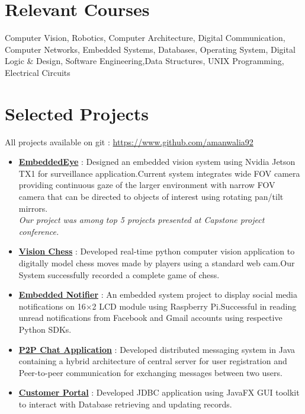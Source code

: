\documentclass[margin, centered]{res}
\begin{document}
\begin{resume}
\section{Relevant \hspace{2mm} Courses}
 
Computer Vision, Robotics, Computer Architecture, Digital Communication, Computer Networks, Embedded Systems, Databases, Operating System, Digital Logic \& Design, Software Engineering,Data Structures, UNIX Programming, Electrical Circuits 

\section{Selected Projects}
All projects available on git : \url{https://www.github.com/amanwalia92}\\
\begin{itemize}[leftmargin=*]
    \item \textbf{\href{https://github.com/amanwalia92/EmbeddedEye}{EmbeddedEye}} : Designed an embedded vision system using Nvidia Jetson TX1 for surveillance application.Current system integrates wide FOV camera providing continuous gaze of the larger environment with narrow FOV camera that can be directed to objects of interest using rotating pan/tilt mirrors. \\
    \textit{Our project was among top 5 projects presented at Capstone project conference.} 
	\item \textbf{\href{https://github.com/amanwalia92/VisionChess}{Vision Chess}} : Developed real-time python computer vision application to digitally model chess moves made by players using a standard web cam.Our System successfully recorded a complete game of chess.
	\item \textbf{\href{https://github.com/amanwalia92/EmbeddedNotifier}{Embedded Notifier}} : An embedded system project to display social media notifications on 16$\times$2 LCD module using Raspberry  Pi.Successful in reading unread notifications from Facebook and Gmail accounts using respective Python SDKs.
	\item \textbf{\href{https://github.com/amanwalia92/Multi-Threaded-Chat-Network}{P2P Chat Application}} : Developed distributed messaging system in Java containing a hybrid architecture of central server for user registration and Peer-to-peer communication for exchanging messages between two users.
	\item \textbf{\href{https://github.com/amanwalia92/Multi-Threaded-Chat-Network}{Customer Portal}} : Developed JDBC application using JavaFX GUI toolkit to interact with Database retrieving and updating records.
\end{itemize}


\end{resume}
\end{document}
